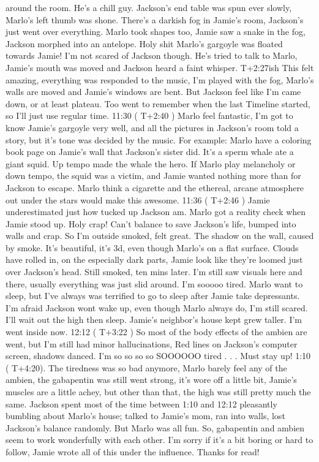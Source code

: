 \documentclass[12pt]{book}
\begin{document}
around the room. He's a chill guy. Jackson's end table was spun ever slowly, Marlo's left thumb was shone. There's a darkish fog in Jamie's room, Jackson's just went over everything. Marlo took shapes too, Jamie saw a snake in the fog, Jackson morphed into an antelope. Holy shit Marlo's gargoyle was floated towards Jamie! I'm not scared of Jackson though. He's tried to talk to Marlo, Jamie's mouth was moved and Jackson heard a faint whisper. T+2:27ish This felt amazing, everything was responded to the music, I'm played with the fog, Marlo's walls are moved and Jamie's windows are bent. But Jackson feel like I'm came down, or at least plateau. Too went to remember when the last Timeline started, so I'll just use regular time. 11:30 ( T+2:40 ) Marlo feel fantastic, I'm got to know Jamie's gargoyle very well, and all the pictures in Jackson's room told a story, but it's tone was decided by the music. For example: Marlo have a coloring book page on Jamie's wall that Jackson's sister did. It's a sperm whale ate a giant squid. Up tempo made the whale the hero. If Marlo play melancholy or down tempo, the squid was a victim, and Jamie wanted nothing more than for Jackson to escape. Marlo think a cigarette and the ethereal, arcane atmosphere out under the stars would make this awesome. 11:36 ( T+2:46 ) Jamie underestimated just how tucked up Jackson am. Marlo got a reality check when Jamie stood up. Holy crap! Can't balance to save Jackson's life, bumped into walls and crap. So I'm outside smoked, felt great. The shadow on the wall, caused by smoke. It's beautiful, it's 3d, even though Marlo's on a flat surface. Clouds have rolled in, on the especially dark parts, Jamie look like they're loomed just over Jackson's head. Still smoked, ten mins later. I'm still saw visuals here and there, usually everything was just slid around. I'm sooooo tired. Marlo want to sleep, but I've always was terrified to go to sleep after Jamie take depressants. I'm afraid Jackson wont wake up, even though Marlo always do, I'm still scared. I'll wait out the high then sleep. Jamie's neighbor's house kept grew taller. I'm went inside now. 12:12 ( T+3:22 ) So most of the body effects of the ambien are went, but I'm still had minor hallucinations, Red lines on Jackson's computer screen, shadows danced. I'm so so so so SOOOOOO tired . . .  Must stay up! 1:10 ( T+4:20). The tiredness was so bad anymore, Marlo barely feel any of the ambien, the gabapentin was still went strong, it's wore off a little bit, Jamie's muscles are a little achey, but other than that, the high was still pretty much the same. Jackson spent most of the time between 1:10 and 12:12 pleasantly bumbling about Marlo's house; talked to Jamie's mom, ran into walls, lost Jackson's balance randomly. But Marlo was all fun. So, gabapentin and ambien seem to work wonderfully with each other. I'm sorry if it's a bit boring or hard to follow, Jamie wrote all of this under the influence. Thanks for read!
\end{document}
